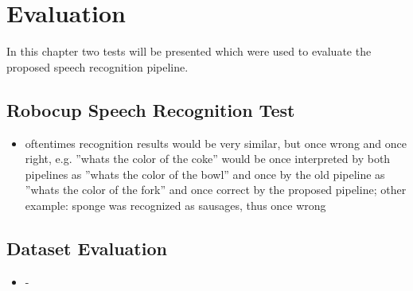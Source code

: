 

\chapter{Evaluation}

In this chapter two tests will be presented which were used to evaluate the proposed speech recognition pipeline.

\section{Robocup Speech Recognition Test}

\begin{itemize}
	\item oftentimes recognition results would be very similar, but once wrong and once right, e.g. ''whats the color of the coke'' would be once interpreted by both pipelines as ''whats the color of the bowl'' and once by the old pipeline as ''whats the color of the fork'' and once correct by the proposed pipeline; other example: sponge was recognized as sausages, thus once wrong
\end{itemize}

\section{Dataset Evaluation}

\begin{itemize}
	\item -
\end{itemize}
